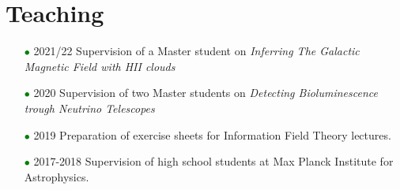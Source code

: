 \documentclass[11pt,a4paper,sans, table, dvipsnames]{moderncv}        %
\begin{document}
\section{Teaching}
\begin{itemize}
\item[\textcolor{Green}{$\bullet$}] 2021/22 Supervision of a Master student
on  \textit{Inferring The Galactic Magnetic Field with HII clouds}
\vspace{5pt}

\item[\textcolor{Green}{$\bullet$}] 2020 Supervision of two Master students on
\textit{Detecting Bioluminescence trough Neutrino Telescopes}

\vspace{5pt}

\item[\textcolor{Green}{$\bullet$}] 2019 Preparation of exercise sheets for Information Field Theory lectures.

\vspace{5pt}

\item[\textcolor{Green}{$\bullet$}] 2017-2018 Supervision of high school students at Max Planck Institute for Astrophysics.
\end{itemize}






\end{document}
